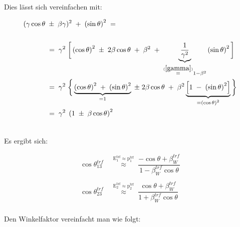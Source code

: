 \documentclass[
a4paper,                                %
twoside,                                %
BCOR1.4cm,                      %
ngerman,                                %
10pt,                           %
headings=normal,                %
headsepline,                    %
clearplainpage, %
final,                                  %
div=14,
parskip=full
]{scrbook}
\begin{document}
Dies l\"asst sich vereinfachen mit:

\begin{align}
	( \gamma \cos \theta
	\;&\pm\;\beta \gamma )^{2}
	\;+\;\left( \sin \theta \right)^{2}
\;=\;
\nonumber
\\
\nonumber
\\
\;&=\;
	\gamma^{2}\;\bigg[
	\left( \cos \theta \right)^{2}
	\;\pm\;2 \beta \cos \theta
	\;+\;\beta^{2} 
	\;+\;\underbrace{\dfrac{1}{\gamma^{2}}}
	_{\stackrel{\mathrm{(\ref{gamma})}}=1-\beta^{2}}
	\left( \sin \theta \right)^{2}
	\bigg]
\nonumber
\\
\;&=\;
	\gamma^{2}\;\bigg \{
	\underbrace{\left( \cos \theta \right)^{2}
	\;+\;\left( \sin \theta \right)^{2}}_{=1}
	\;\pm\;2 \beta \cos \theta
	\;+\;\beta^{2} \underbrace{\left[1
	\;-\;\left( \sin \theta \right)^{2}\right]}_{=\left( \cos \theta \right)^{2}}
	\bigg \}
\nonumber
\\
\;&=\;
	\gamma^{2}\;\left(
	1\;\pm\;\beta \cos \theta \right)^{2}
\nonumber
\\
\nonumber
\end{align} 

Es ergibt sich:

\begin{align}
	\cos \theta_{13}^{trf}
\;&\stackrel{\mathrm{E_{1}^{trf}\approx p_{1}^{trf}}}\approx\;
	\dfrac{- \cos \theta + \beta_{W}^{trf}}{1 - \beta_{W}^{trf} \cos \theta}
\\
\nonumber
\\
	\cos \theta_{23}^{trf}
\;&\stackrel{\mathrm{E_{2}^{trf}\approx p_{2}^{trf}}}\approx\;
	\dfrac{\cos \theta + \beta_{W}^{trf}}{1 + \beta_{W}^{trf} \cos \theta}
\\
\nonumber
\end{align}

Den Winkelfaktor vereinfacht man wie folgt:
\end{document}
